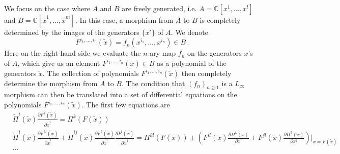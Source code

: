 \documentclass[11pt]{article}
\newcommand{\C}{\mathbb{C}}
\numberwithin{equation}{section}
\begin{document}
We focus on the case where $A$ and $B$ are freely generated, i.e. $A = \C[x^1,\dots,x^l]$ and $B = \C[\widetilde{x}^1,\dots,\widetilde{x}^{m}]$. In this case, a morphism from $A$ to $B$ is completely determined by the images of the generators $\{x^i\}$ of $A$. We denote
\begin{equation}
		F^{i_1,\dots,i_n}(\widetilde{x}) = f_n(x^{i_1},\dots,x^{i_n}) \in B\,.
\end{equation}
Here on the right-hand side we evaluate the $n$-ary map $f_n$ on the generators $x$'s of $A$, which give us an element $F^{i_1,\dots,i_n}(\widetilde{x}) \in B$ as a polynomial of the generators $\widetilde{x}$. The collection of polynomials $F^{i_1,\dots,i_n}(\widetilde{x})$ then completely determine the morphism from $A$ to $B$. The condition that $(f_n)_{n\geq 1}$ is a $L_\infty$ morphism can then be translated into a set of differential equations on the polynomials $F^{i_1,\dots,i_n}(\widetilde{x})$. The first few equations are
\begin{equation}\label{eq:Linf_mor}
	\begin{aligned}
		&\widetilde{\Pi}^{i}(\widetilde{x})\frac{\partial F^k(\widetilde{x})}{\partial \widetilde{x}^i} = \Pi^{k}(F(\widetilde{x}))\\
		&\widetilde{\Pi}^{i}(\widetilde{x})\frac{\partial F^{kl}(\widetilde{x})}{\partial \widetilde{x}^i} + \widetilde{\Pi}^{ij}(\widetilde{x})\frac{\partial F^{k}(\widetilde{x})}{\partial \widetilde{x}^i}\frac{\partial F^{l}(\widetilde{x})}{\partial \widetilde{x}^j} = \Pi^{kl}(F(\widetilde{x})) \pm \left(F^{il}(\widetilde{x})\frac{\partial \Pi^k(x)}{\partial x^i} + F^{jl}(\widetilde{x})\frac{\partial \Pi^k(x)}{\partial x^j}\right)\Big|_{x = F(\widetilde{x})}\\
		&\cdots
	\end{aligned}
\end{equation}
\end{document}
